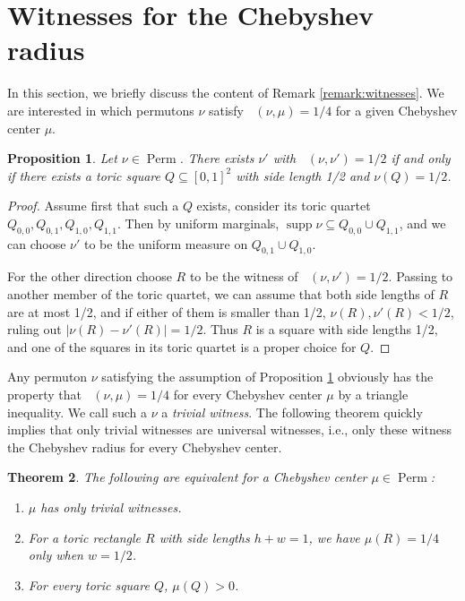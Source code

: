 \documentclass{article}
\newcommand{\Perm}{\mathop{\mathrm{Perm}}}
\newcommand{\ds}{\mathop{d_\square}}
\newcommand{\supp}{\mathop{\mathrm{supp}}}
\newtheorem{theorem}{Theorem}[section]
\newtheorem{prop}[theorem]{Proposition}
\theoremstyle{definition}
\begin{document}
\section{Witnesses for the Chebyshev radius} \label{sec:examples}

In this section, we briefly discuss the content of Remark \ref{remark:witnesses}.
We are interested in which permutons $\nu$ satisfy $\ds(\nu, \mu)=1/4$ for a given Chebyshev center $\mu$.

\begin{prop} \label{prop:universal_witnesses}
Let $\nu\in \Perm$. There exists $\nu'$ with $\ds(\nu, \nu')=1/2$ if and only if there exists a toric square $Q\subseteq [0, 1]^2$ with side length 1/2 and $\nu(Q)=1/2$.
\end{prop}

\begin{proof}
    Assume first that such a $Q$ exists, consider its toric quartet $Q_{0,0}, Q_{0, 1}, Q_{1, 0}, Q_{1,1}$. Then by uniform marginals, $\supp \nu \subseteq Q_{0, 0}\cup Q_{1, 1}$, and we can choose $\nu'$ to be the uniform measure on $Q_{0, 1}\cup Q_{1, 0}$.

    For the other direction choose $R$ to be the witness of $\ds(\nu, \nu')=1/2$. Passing to another member of the toric quartet, we can assume that both side lengths of $R$ are at most 1/2, and if either of them is smaller than 1/2, $\nu(R),\nu'(R)<1/2$, ruling out $|\nu(R)-\nu'(R)|=1/2$. Thus $R$ is a square with side lengths 1/2, and one of the squares in its toric quartet is a proper choice for $Q$.
\end{proof}

Any permuton $\nu$ satisfying the assumption of Proposition \ref{prop:universal_witnesses} obviously has the property that $\ds(\nu, \mu)=1/4$ for every Chebyshev center $\mu$ by a triangle inequality. We call such a $\nu$ a \emph{trivial witness}. The following theorem quickly implies that only trivial witnesses are universal witnesses, i.e., only these witness the Chebyshev radius for every Chebyshev center.

\begin{theorem}\label{thm:only_trivial_witnesses_equivalence}
    The following are equivalent for a Chebyshev center $\mu\in \Perm$:
    \begin{enumerate}
        \item[(i)] $\mu$ has only trivial witnesses.
        \item[(ii)] For a toric rectangle $R$ with side lengths $h+w=1$, we have $\mu(R)=1/4$ only when $w=1/2$.
        \item[(iii)] For every toric square $Q$, $\mu(Q)>0$.
    \end{enumerate}
\end{theorem}
\end{document}
